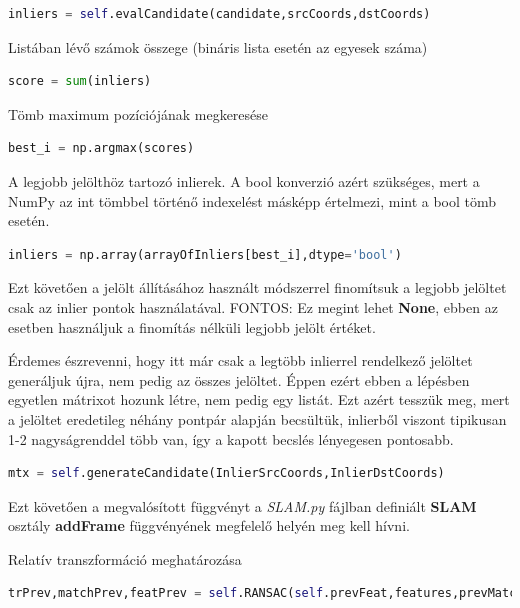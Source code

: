 \documentclass[12pt,a4paper,oneside]{report}             %
\begin{document}
\begin{lstlisting}[language=Python]
inliers = self.evalCandidate(candidate,srcCoords,dstCoords)
\end{lstlisting}

Listában lévő számok összege (bináris lista esetén az egyesek száma)

\begin{lstlisting}[language=Python]
score = sum(inliers)
\end{lstlisting}

Tömb maximum pozíciójának megkeresése

\begin{lstlisting}[language=Python]
best_i = np.argmax(scores)
\end{lstlisting}

A legjobb jelölthöz tartozó inlierek. A bool konverzió azért szükséges, mert a NumPy az int tömbbel történő indexelést másképp értelmezi, mint a bool tömb esetén.

\begin{lstlisting}[language=Python]
inliers = np.array(arrayOfInliers[best_i],dtype='bool')
\end{lstlisting}

Ezt követően a jelölt állításához használt módszerrel finomítsuk a legjobb jelöltet csak az inlier pontok használatával. FONTOS: Ez megint lehet \textbf{None}, ebben az esetben használjuk a finomítás nélküli legjobb jelölt értéket.

Érdemes észrevenni, hogy itt már csak a legtöbb inlierrel rendelkező jelöltet generáljuk újra, nem pedig az összes jelöltet. Éppen ezért ebben a lépésben egyetlen mátrixot hozunk létre, nem pedig egy listát. Ezt azért tesszük meg, mert a jelöltet eredetileg néhány pontpár alapján becsültük, inlierből viszont tipikusan 1-2 nagyságrenddel több van, így a kapott becslés lényegesen pontosabb.

\begin{lstlisting}[language=Python]
mtx = self.generateCandidate(InlierSrcCoords,InlierDstCoords)
\end{lstlisting}

Ezt követően a megvalósított függvényt a \emph{SLAM.py} fájlban definiált \textbf{SLAM} osztály \textbf{addFrame} függvényének megfelelő helyén meg kell hívni.

Relatív transzformáció meghatározása

\begin{lstlisting}[language=Python]
trPrev,matchPrev,featPrev = self.RANSAC(self.prevFeat,features,prevMatch)
\end{lstlisting}
\end{document}
